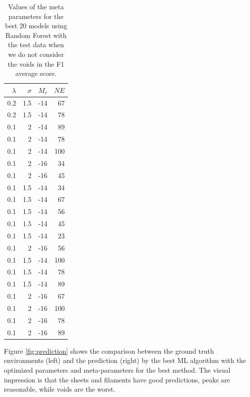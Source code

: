 \documentclass[usenatbib]{mnras}
\begin{document}
\begin{table}
\centering
\begin{tabular}{rrrr}
\hline
   $\lambda$ &   $\sigma$ &   $M_r$ &   $NE$ \\
\hline
         0.2 &        1.5 &     -14 &     67 \\
         0.2 &        1.5 &     -14 &     78 \\
         0.1 &        2   &     -14 &     89 \\
         0.1 &        2   &     -14 &     78 \\
         0.1 &        2   &     -14 &    100 \\
         0.1 &        2   &     -16 &     34 \\
         0.1 &        2   &     -16 &     45 \\
         0.1 &        1.5 &     -14 &     34 \\
         0.1 &        1.5 &     -14 &     67 \\
         0.1 &        1.5 &     -14 &     56 \\
         0.1 &        1.5 &     -14 &     45 \\
         0.1 &        1.5 &     -14 &     23 \\
         0.1 &        2   &     -16 &     56 \\
         0.1 &        1.5 &     -14 &    100 \\
         0.1 &        1.5 &     -14 &     78 \\
         0.1 &        1.5 &     -14 &     89 \\
         0.1 &        2   &     -16 &     67 \\
         0.1 &        2   &     -16 &    100 \\
         0.1 &        2   &     -16 &     78 \\
         0.1 &        2   &     -16 &     89 \\
\hline
\end{tabular}
\caption{Values of the meta parameters for the best 20 models using Random Forest with the test data when we do not consider the voids in the F1 average score.}
\label{tab:metaparameters}
\end{table}

Figure \ref{fig:prediction} shows the comparison between the ground
truth environments (left) and the prediction (right) by the best ML algorithm
with the optimized parameters and meta-parameters  for the best
method. 
The visual impression is that the sheets and filaments have good predictions,
peaks are reasonable, while voids are the worst. 
\end{document}
